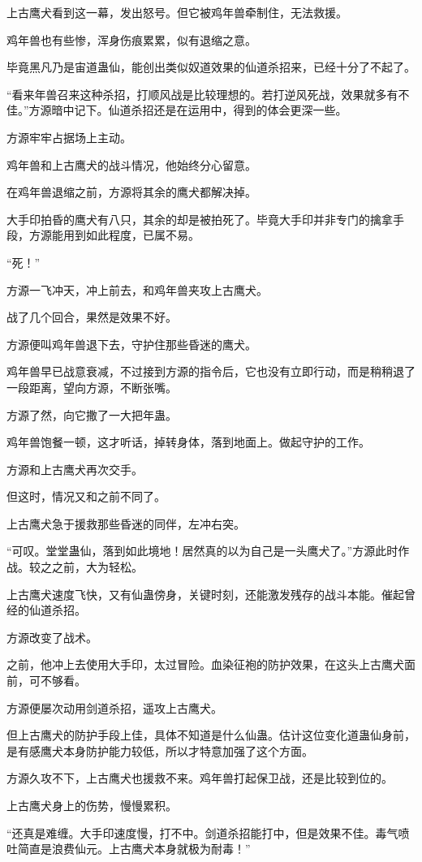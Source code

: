 \begin{this_body}
上古鹰犬看到这一幕，发出怒号。但它被鸡年兽牵制住，无法救援。

鸡年兽也有些惨，浑身伤痕累累，似有退缩之意。

毕竟黑凡乃是宙道蛊仙，能创出类似奴道效果的仙道杀招来，已经十分了不起了。

“看来年兽召来这种杀招，打顺风战是比较理想的。若打逆风死战，效果就多有不佳。”方源暗中记下。仙道杀招还是在运用中，得到的体会更深一些。

方源牢牢占据场上主动。

鸡年兽和上古鹰犬的战斗情况，他始终分心留意。

在鸡年兽退缩之前，方源将其余的鹰犬都解决掉。

大手印拍昏的鹰犬有八只，其余的却是被拍死了。毕竟大手印并非专门的擒拿手段，方源能用到如此程度，已属不易。

“死！”

方源一飞冲天，冲上前去，和鸡年兽夹攻上古鹰犬。

战了几个回合，果然是效果不好。

方源便叫鸡年兽退下去，守护住那些昏迷的鹰犬。

鸡年兽早已战意衰减，不过接到方源的指令后，它也没有立即行动，而是稍稍退了一段距离，望向方源，不断张嘴。

方源了然，向它撒了一大把年蛊。

鸡年兽饱餐一顿，这才听话，掉转身体，落到地面上。做起守护的工作。

方源和上古鹰犬再次交手。

但这时，情况又和之前不同了。

上古鹰犬急于援救那些昏迷的同伴，左冲右突。

“可叹。堂堂蛊仙，落到如此境地！居然真的以为自己是一头鹰犬了。”方源此时作战。较之之前，大为轻松。

上古鹰犬速度飞快，又有仙蛊傍身，关键时刻，还能激发残存的战斗本能。催起曾经的仙道杀招。

方源改变了战术。

之前，他冲上去使用大手印，太过冒险。血染征袍的防护效果，在这头上古鹰犬面前，可不够看。

方源便屡次动用剑道杀招，遥攻上古鹰犬。

但上古鹰犬的防护手段上佳，具体不知道是什么仙蛊。估计这位变化道蛊仙身前，是有感鹰犬本身防护能力较低，所以才特意加强了这个方面。

方源久攻不下，上古鹰犬也援救不来。鸡年兽打起保卫战，还是比较到位的。

上古鹰犬身上的伤势，慢慢累积。

“还真是难缠。大手印速度慢，打不中。剑道杀招能打中，但是效果不佳。毒气喷吐简直是浪费仙元。上古鹰犬本身就极为耐毒！”


\end{this_body}
